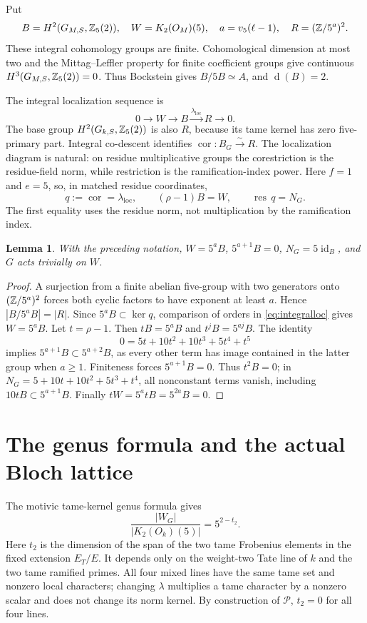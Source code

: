 \documentclass[11pt]{article}
\newtheorem{lemma}[theorem]{Lemma}
\theoremstyle{remark}\newtheorem{remark}[theorem]{Remark}
\newcommand{\res}{\operatorname{res}}\newcommand{\cor}{\operatorname{cor}}
\newcommand{\dgen}{\operatorname{d}}
\begin{document}
Put
\[
 B=H^2(G_{M,S},\mathbb Z_5(2)),\quad W=K_2(O_M)(5),
 \quad a=v_5(\ell-1),\quad R=(\mathbb Z/5^a)^2.
\]
These integral cohomology groups are finite. Cohomological dimension at most
two and the Mittag--Leffler property for finite coefficient groups give
continuous \(H^3(G_{M,S},\mathbb Z_5(2))=0\). Thus Bockstein gives
\(B/5B\simeq A\), and \(\dgen(B)=2\).

The integral localization sequence is
\begin{equation}\label{eq:integralloc}
 0\longrightarrow W\longrightarrow B
 \xrightarrow{\lambda_{\mathrm{loc}}}R\longrightarrow0.
\end{equation}
The base group \(H^2(G_{k,S},\mathbb Z_5(2))\) is also \(R\), because its tame
kernel has zero five-primary part. Integral co-descent
\cite[Theorem 1.5 and the following paragraph]{AM12} identifies
\(\cor:B_G\xrightarrow{\sim}R\).
The localization diagram is natural: on residue multiplicative groups the
corestriction is the residue-field norm, while restriction is the
ramification-index power. Here \(f=1\) and \(e=5\), so, in matched residue
coordinates,
\begin{equation}\label{eq:transfer}
 q:=\cor=\lambda_{\mathrm{loc}},\qquad
 (\rho-1)B=W,\qquad \res\,q=N_G.
\end{equation}
The first equality uses the residue norm, not multiplication by the
ramification index.

\begin{lemma}\label{lem:integral}
With the preceding notation, \(W=5^aB\), \(5^{a+1}B=0\),
\(N_G=5\operatorname{id}_B\), and \(G\) acts trivially on \(W\).
\end{lemma}
\begin{proof}
A surjection from a finite abelian five-group with two generators onto
\((\mathbb Z/5^a)^2\) forces both cyclic factors to have exponent at least \(a\).
Hence \(|B/5^aB|=|R|\). Since \(5^aB\subset\ker q\), comparison of orders
in \eqref{eq:integralloc} gives \(W=5^aB\).
Let \(t=\rho-1\). Then \(tB=5^aB\) and \(t^jB=5^{aj}B\).
The identity
\[
 0=5t+10t^2+10t^3+5t^4+t^5
\]
implies \(5^{a+1}B\subset5^{a+2}B\), as every other term has image contained
in the latter group when \(a\ge1\). Finiteness forces \(5^{a+1}B=0\).
Thus \(t^2B=0\); in
\(N_G=5+10t+10t^2+5t^3+t^4\), all nonconstant terms vanish, including
\(10tB\subset5^{a+1}B\). Finally
\(tW=5^atB=5^{2a}B=0\).
\end{proof}

\section{The genus formula and the actual Bloch lattice}
The motivic tame-kernel genus formula
\cite[Proposition 4.11 and Corollary 4.12]{AM19} gives
\[
 \frac{|W_G|}{|K_2(O_k)(5)|}=5^{2-t_2}.
\]
Here \(t_2\) is the dimension of the span of the two tame Frobenius elements
in the fixed extension \(E_T/E\). It depends only on the weight-two Tate line
of \(k\) and the two tame ramified primes. All four mixed lines have the same
tame set and nonzero local characters; changing \(\lambda\) multiplies a tame
character by a nonzero scalar and does not change its norm kernel.
By construction of \(\mathcal P\), \(t_2=0\) for all four lines.
\end{document}
